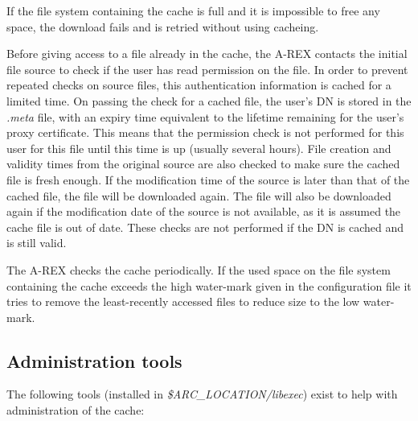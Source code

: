 \documentclass{article}                            %
\begin{document}
If the file system containing the cache is full and it is impossible
to free any space, the download fails and is retried without using
cacheing.

Before giving access to a file already in the cache, the A-REX
contacts the initial file source to check if the user has read
permission on the file. In order to prevent repeated checks on source
files, this authentication information is cached for a limited
time. On passing the check for a cached file, the user's DN is stored
in the \emph{.meta} file, with an expiry time equivalent to the
lifetime remaining for the user's proxy certificate. This means that
the permission check is not performed for this user for this file
until this time is up (usually several hours). File creation and
validity times from the original source are also checked to make sure
the cached file is fresh enough. If the modification time of the
source is later than that of the cached file, the file will be
downloaded again. The file will also be downloaded again if the
modification date of the source is not available, as it is assumed the
cache file is out of date. These checks are not performed if the DN is
cached and is still valid.

The A-REX checks the cache periodically. If the used space on the file
system containing the cache exceeds the high water-mark given in the
configuration file it tries to remove the least-recently accessed
files to reduce size to the low water-mark.


\subsection{Administration tools}

The following tools (installed in \emph{\$ARC\_LOCATION/libexec})
exist to help with administration of the cache:
\end{document}
